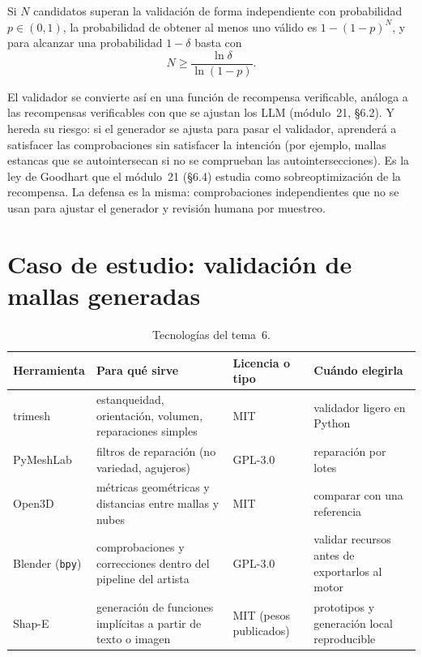 \addtocounter{figure}{1}%

\begin{proposicion}[Lo mejor de $N$]\label{prop:mejorN}
Si $N$ candidatos superan la validación de forma independiente con probabilidad $p\in(0,1)$, la probabilidad de obtener al menos uno válido es $1-(1-p)^N$, y para alcanzar una probabilidad $1-\delta$ basta con
\[
N\ge\frac{\ln\delta}{\ln(1-p)} .
\]
\end{proposicion}

El validador se convierte así en una función de recompensa verificable, análoga a las recompensas verificables con que se ajustan los LLM (módulo~21, §6.2). Y hereda su riesgo: si el generador se ajusta para pasar el validador, aprenderá a satisfacer las comprobaciones sin satisfacer la intención (por ejemplo, mallas estancas que se autointersecan si no se comprueban las autointersecciones). Es la ley de Goodhart que el módulo~21 (§6.4) estudia como sobreoptimización de la recompensa. La defensa es la misma: comprobaciones independientes que no se usan para ajustar el generador y revisión humana por muestreo.

\section{Caso de estudio: validación de mallas generadas}

\addtocounter{definicion}{1}%

\begin{table}[h]
\centering\small
\begin{tabularx}{\textwidth}{@{}l>{\raggedright\arraybackslash}X>{\raggedright\arraybackslash}p{2.6cm}>{\raggedright\arraybackslash}X@{}}
\toprule
Herramienta & Para qué sirve & Licencia o tipo & Cuándo elegirla \\
\midrule
trimesh & estanqueidad, orientación, volumen, reparaciones simples & MIT & validador ligero en Python \\
PyMeshLab & filtros de reparación (no variedad, agujeros) & GPL-3.0 & reparación por lotes \\
Open3D & métricas geométricas y distancias entre mallas y nubes & MIT & comparar con una referencia \\
Blender (\texttt{bpy}) & comprobaciones y correcciones dentro del pipeline del artista & GPL-3.0 & validar recursos antes de exportarlos al motor \\
Shap-E & generación de funciones implícitas a partir de texto o imagen & MIT (pesos publicados) & prototipos y generación local reproducible \\
\bottomrule
\end{tabularx}
\caption{Tecnologías del tema~6.}
\label{tab:tec6}
\end{table}

\addtocounter{definicion}{1}%

